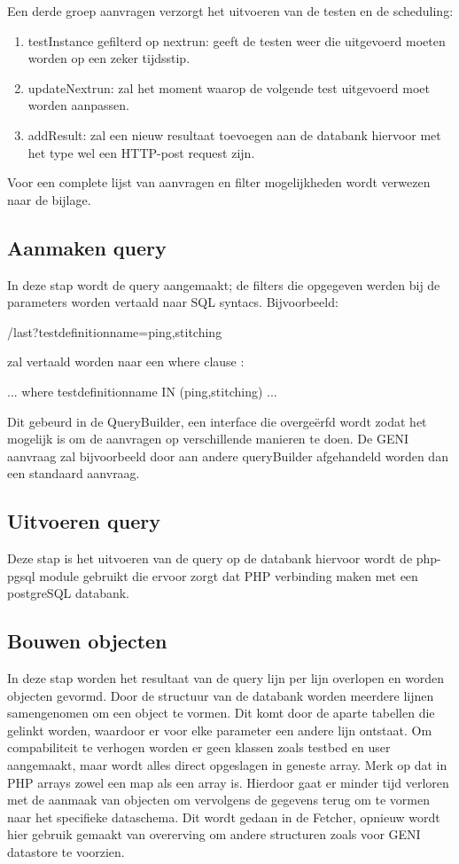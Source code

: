 \clearpage
Een derde groep aanvragen verzorgt het uitvoeren van de testen en de scheduling:
\begin{enumerate}
\item testInstance gefilterd op nextrun: geeft de testen weer die uitgevoerd moeten worden op een zeker tijdsstip.
\item updateNextrun: zal het moment waarop de volgende test uitgevoerd moet worden aanpassen.
\item addResult: zal een nieuw resultaat toevoegen aan de databank hiervoor met het type wel een HTTP-post request zijn.
\end{enumerate}
Voor een complete lijst van aanvragen en filter mogelijkheden wordt verwezen naar de bijlage.
\subsection{Aanmaken query}
\npar 
In deze stap wordt de query aangemaakt; de filters die opgegeven werden bij de parameters worden vertaald naar SQL syntacs. Bijvoorbeeld:
\begin{lt}
/last?testdefinitionname=ping,stitching
\end{lt}
zal vertaald worden naar een where clause :
\begin{lt}
... where testdefinitionname IN (ping,stitching) ...
\end{lt}
\npar
Dit gebeurd in de QueryBuilder, een interface die overge\"erfd wordt zodat het mogelijk is om de aanvragen op verschillende manieren te doen. De GENI aanvraag zal bijvoorbeeld door aan andere queryBuilder afgehandeld worden dan een standaard aanvraag.
\subsection{Uitvoeren query}
\npar
Deze stap is het uitvoeren van de query op de databank hiervoor wordt de php-pgsql module gebruikt die ervoor zorgt dat PHP verbinding maken met een postgreSQL databank.
\clearpage
\subsection{Bouwen objecten}
\npar
In deze stap worden het resultaat van de query lijn per lijn overlopen en worden objecten gevormd. Door de structuur van de databank worden meerdere lijnen samengenomen om een object te vormen. Dit komt door de aparte tabellen die gelinkt worden, waardoor er voor elke parameter een andere lijn ontstaat.
\npar
Om compabiliteit te verhogen worden er geen klassen zoals testbed en user aangemaakt, maar wordt alles direct opgeslagen in geneste array. Merk op dat in PHP arrays zowel een map als een array is. Hierdoor gaat er minder tijd verloren met de aanmaak van objecten om vervolgens de gegevens terug om te vormen naar het specifieke dataschema. Dit wordt gedaan in de Fetcher, opnieuw wordt hier gebruik gemaakt van overerving om andere structuren zoals voor GENI datastore te voorzien.
